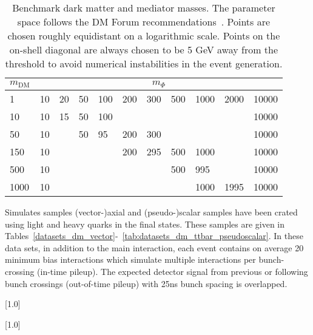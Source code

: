 \begin{table}[h!] \centering \begin{tabular}{l|llllllllll}\hline \hline
$m_\textrm{DM}$  & \multicolumn{10}{c}{$m_\Phi$}
\\ \hline 1    & 10 & 20 & 50 & 100 & 200 & 300 & 500 & 1000 & 2000 & 10000 \\
10   & 10 & 15 & 50 & 100 &     &     &     &      &      & 10000 \\ 50   & 10 &
& 50 & 95  & 200 & 300 &     &      &      & 10000 \\ 150  & 10 &    &    &
& 200 & 295 & 500 & 1000 &      & 10000 \\ 500  & 10 &    &    &     &     &
& 500 & 995  &      & 10000 \\ 1000 & 10 &    &    &     &     &     &     &
1000 & 1995 & 10000\\ \hline \hline \end{tabular} \caption{Benchmark dark
matter and mediator masses. The parameter space follows the
DM Forum recommendations~\cite{Abercrombie:2015wmb}. Points are chosen roughly
equidistant on a logarithmic scale. Points on the on-shell diagonal are always 
chosen to be 5 GeV away from the threshold to avoid numerical instabilities in 
the event generation.} \label{tab:DMgrid} \end{table}


\dub

Simulates samples (vector-)axial and (pseudo-)scalar samples have been crated using light and heavy quarks in the final states.
These samples are given in Tables~\ref{datasets_dm_vector}-~\ref{tab:datasets_dm_ttbar_pseudoscalar}. In these data sets, in addition to the main interaction, each
event contains on average 20 minimum bias interactions which simulate
multiple interactions per bunch-crossing (in-time pileup). The expected
detector signal from previous or following bunch crossings (out-of-time
pileup) with 25ns bunch spacing is overlapped.

\begin{table}[!p]
 \centering
{}
 \scriptsize
 \scalebox{.7}[1.0]{}
\label{datasets_dm_vector}
\end{table}

\begin{table}[!p]
 \centering
{}
 \tiny
 \scalebox{.7}[1.0]{}
\label{datasets_dm_axial}
\end{table}

